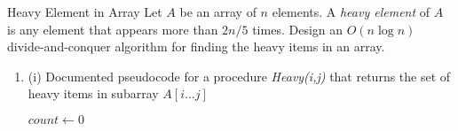 \documentclass{article}
\begin{document}
\newpage
\begin{section}{Heavy Element in Array}
Let $A$ be an array of $n$ elements. A {\em heavy element} of $A$ is any element that appears more than $2n/5$ times. Design an $O (n \log n)$ divide-and-conquer algorithm for finding the heavy items in an array. 

\begin{enumerate}
    \item (i) Documented pseudocode for a procedure {\em Heavy(i,j)} that returns the set of heavy items in subarray $A[i\dots j]$
        
        
        \begin{minipage}{\linewidth}
        \begin{algorithm}[H]
        \caption{Heavy(i, j)}
        \end{algorithm}
        \end{minipage}
        
        \begin{minipage}{\linewidth}
        \begin{algorithm}[H]
        \caption{CountHeavy(x, i, j)}
            $count \gets 0$ \\
                                                                   
        \end{algorithm}
        \end{minipage}
        

\end{enumerate}
\end{section}
\end{document}
